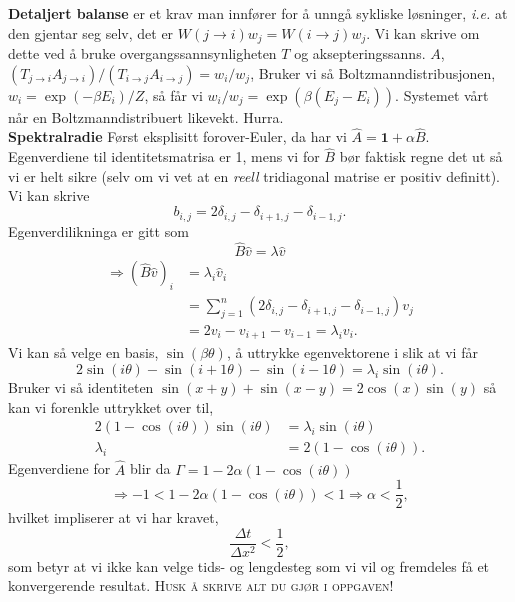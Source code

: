 \documentclass[12pt,a4paper,twocolumn]{article}
\begin{document}
\begin{flushleft}
\textbf{Detaljert balanse} er et krav man innfører for å unngå sykliske løsninger, \emph{i.e.} at den gjentar seg selv, det er $W(j\to i)w_j=W(i\to j)w_j$. Vi kan skrive om dette ved å bruke overgangssannsynligheten $T$ og aksepteringssanns. $A$, $(T_{j\to i}A_{j\to i})/(T_{i\to j}A_{i\to j}) = w_i/w_j$, Bruker vi så Boltzmanndistribusjonen, $w_i = \exp(-\beta E_i)/Z$, så får vi $w_i/w_j = \exp(\beta(E_j-E_i))$. Systemet vårt når en Boltzmanndistribuert likevekt. Hurra.\\
\textbf{Spektralradie}
Først eksplisitt forover-Euler, da har vi $\hat A = \mathbf{1} + \alpha \hat B$. Egenverdiene til identitetsmatrisa er 1, mens vi for $\hat B$ bør faktisk regne det ut så vi er helt sikre (selv om vi vet at en \emph{reell} tridiagonal matrise er positiv definitt). Vi kan skrive
$$ b_{i,j} = 2\delta_{i,j} - \delta_{i+1,j} - \delta_{i-1,j}. $$
Egenverdilikninga er gitt som
$$ \hat B \hat v = \lambda \hat v $$
\begin{align*}
  \Rightarrow (\hat B \hat v)_i &= \lambda_i \hat v_i \\
  &= \sum\limits_{j=1}^{n}(2\delta_{i,j} - \delta_{i+1,j} - \delta_{i-1,j})v_j \\
  &= 2v_{i} - v_{i+1} - v_{i-1} = \lambda_i v_i.
\end{align*}
Vi kan så velge en basis, $\sin(\beta\theta)$, å uttrykke egenvektorene i slik at vi får
$$ 2\sin(i\theta) - \sin(i+1\theta) - \sin(i-1\theta) = \lambda_i \sin(i\theta). $$
Bruker vi så identiteten $\sin(x+y) + \sin(x-y) = 2\cos(x)\sin(y)$ så kan vi forenkle uttrykket over til,
\begin{align*}
2(1 - \cos(i\theta) )\sin(i\theta) &= \lambda_i \sin(i\theta) \\
\lambda_i &= 2(1 - \cos(i\theta) ).
\end{align*}
Egenverdiene for $\hat A$ blir da $\Gamma = 1-2\alpha(1 - \cos(i\theta) )$
$$ \Rightarrow -1 < 1-2\alpha(1 - \cos(i\theta) ) < 1 \Rightarrow \alpha < \frac{1}{2}, $$
hvilket impliserer at vi har kravet,
$$ \frac{\Delta t}{\Delta x^2} < \frac{1}{2}, $$
som betyr at vi ikke kan velge tids- og lengdesteg som vi vil og fremdeles få et konvergerende resultat.
\textsc{\large Husk å skrive alt du gjør i oppgaven!}
\end{flushleft}
\end{document}
